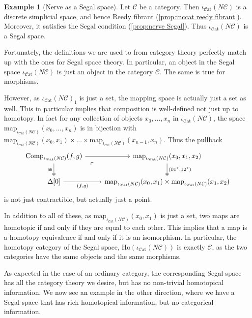 \documentclass[11pt, a4paper]{amsart}
\newcommand{\cC}{\mathcal{C}}
\newcommand{\map}{\mathrm{map}}
\newcommand{\Cat}{\mathscr{C}\mathrm{at}}
\newcommand{\Ho}{\mathrm{Ho}}
\newcommand{\inccat}{\iota_{\Cat}}
\newcommand{\Comp}{\mathrm{Comp}}
\theoremstyle{definition}
\newtheorem{example}[equation]{Example}
\theoremstyle{remark}
\numberwithin{equation}{section}
\begin{document}
\begin{example}[Nerve as a Segal space] \label{ex:nerve}
  Let $\cC$ be a category. Then $\inccat(N\cC)$ is a discrete simplicial space, and hence Reedy fibrant (\cref{prop:inccat reedy fibrant}). Moreover, it satisfies the Segal condition (\cref{prop:nerve Segal}). Thus $\inccat(N\cC)$ is a Segal space.
  
  Fortunately, the definitions we are used to from category theory perfectly match up with the ones for Segal space theory. In particular, an object in the Segal space $\inccat(N\cC)$ is just an object in the category $\cC$. The same is true for morphisms.

  However, as $\inccat(N\cC)_1$ is just a set, the mapping space is actually just a set as well. This in particular implies that composition is well-defined not just up to homotopy. In fact for any collection of objects $x_0, ... , x_n$ in $\inccat(N\cC)$, the space $\map_{\inccat(N\cC)}(x_0,...,x_n)$ is in bijection with $\map_{\inccat(N\cC)}(x_0,x_1) \times ... \times \map_{\inccat(N\cC)}(x_{n-1},x_n)$. Thus the pullback 
  \[
    \begin{tikzcd}
     \Comp_{\inccat(N\cC)}(f,g) \arrow[r] \arrow[d, twoheadrightarrow, "\cong"'] \arrow[dr, phantom, "\ulcorner", very near start] & \map_{\inccat(N\cC)}(x_0,x_1,x_2) \arrow[d, "{(01^*, 12^*)}", twoheadrightarrow] \\
     \Delta[0] \arrow[r, "{(f , g)}"'] & \map_{\inccat(N\cC)}(x_0,x_1) \times \map_{\inccat(N\cC)}(x_1,x_2)
    \end{tikzcd}
  \]
  is not just contractible, but actually just a point.
   
  In addition to all of these, as $\map_{\inccat(N\cC)}(x_0,x_1)$ is just a set, two maps are homotopic if and only if they are equal to each other. This implies that a map is a homotopy equivalence if and only if it is an isomorphism. In particular, the homotopy category of the Segal space, $\Ho(\inccat (N \cC))$ is exactly $\cC$, as the two categories have the same objects and the same morphisms.
 \end{example}

 As expected in the case of an ordinary category, the corresponding Segal space has all the category theory we desire, but has no non-trivial homotopical information. We now see an example in the other direction, where we have a Segal space that has rich homotopical information, but no categorical information.
\end{document}

